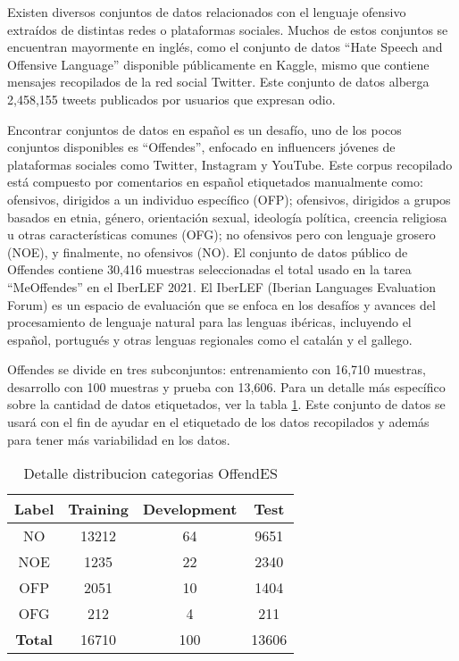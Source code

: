 Existen diversos conjuntos de datos relacionados con el lenguaje ofensivo extraídos de distintas redes o plataformas sociales. Muchos de estos conjuntos se encuentran mayormente en inglés, como el conjunto de datos ``Hate Speech and Offensive Language'' disponible públicamente en Kaggle, mismo que contiene mensajes recopilados de la red social Twitter. Este conjunto de datos alberga 2,458,155 tweets publicados por usuarios que expresan odio.

Encontrar conjuntos de datos en español es un desafío, uno de los pocos conjuntos disponibles es ``Offendes'', enfocado en influencers jóvenes de plataformas sociales como Twitter, Instagram y YouTube. Este corpus recopilado está compuesto por comentarios en español etiquetados manualmente como: ofensivos, dirigidos a un individuo específico (OFP); ofensivos, dirigidos a grupos basados en etnia, género, orientación sexual, ideología política, creencia religiosa u otras características comunes (OFG); no ofensivos pero con lenguaje grosero (NOE), y finalmente, no ofensivos (NO). El conjunto de datos público de Offendes contiene 30,416 muestras seleccionadas el total usado en la tarea ``MeOffendes'' en el IberLEF 2021. El IberLEF (Iberian Languages Evaluation Forum) es un espacio de evaluación que se enfoca en los desafíos y avances del procesamiento de lenguaje natural para las lenguas ibéricas, incluyendo el español, portugués y otras lenguas regionales como el catalán y el gallego.

Offendes se divide en tres subconjuntos: entrenamiento con 16,710 muestras, desarrollo con 100 muestras y prueba con 13,606. Para un detalle más específico sobre la cantidad de datos etiquetados, ver la tabla \ref{tbl:13}. Este conjunto de datos se usará con el fin de ayudar en el etiquetado de los datos recopilados y además para tener más variabilidad en los datos.

\begin{table}[!ht]
	\centering
	\begin{tabular}{|c|c|c|c|}
		\hline
		\textbf{Label} & \textbf{Training} & \textbf{Development} & \textbf{Test} \\ \hline
		NO & 13212 & 64 & 9651 \\ 
		NOE & 1235 & 22 & 2340 \\ 
		OFP & 2051 & 10 & 1404 \\ 
		OFG & 212 & 4 & 211 \\ \hline
		\textbf{Total} & 16710 & 100 & 13606 \\ \hline
	\end{tabular}
	\caption{Detalle distribucion categorias OffendES}
	\label{tbl:13}
\end{table}


